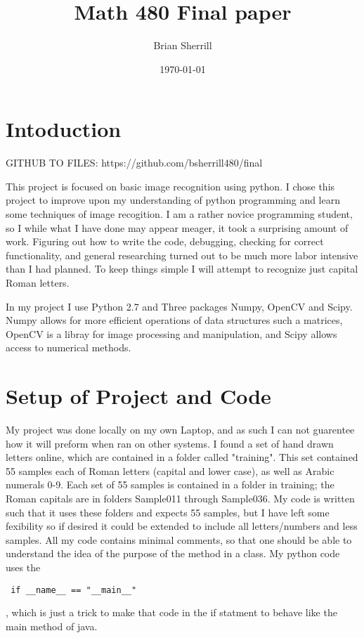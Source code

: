 \documentclass[a4paper]{article}
\title{Math 480 Final paper}
\author{Brian Sherrill}
\date{\today}
\begin{document}
\maketitle

\section*{Intoduction}
GITHUB TO FILES: https://github.com/bsherrill480/final

This project is focused on basic image recognition using python. I chose this project to improve upon my understanding of python programming and learn some techniques of image recogition. I am a rather novice programming student, so I while what I have done may appear meager, it took a surprising amount of work. Figuring out how to write the code, debugging, checking for correct functionality, and general researching turned out to be much more labor intensive than I had planned. To keep things simple I will attempt to recognize just capital Roman letters.

In my project I use Python 2.7 and Three packages Numpy, OpenCV and Scipy. Numpy allows for more efficient operations of data structures such a matrices, OpenCV is a libray for image processing and manipulation, and Scipy allows access to numerical methods. 
\newpage
\tableofcontents
\newpage

\section{Setup of Project and Code}

My project was done locally on my own Laptop, and as such I can not guarentee how it will preform when ran on other systems. I found a set of hand drawn letters online, which are contained in a folder called "training". This set contained 55 samples each of Roman letters (capital and lower case), as well as Arabic numerals 0-9. Each set of 55 samples is contained in a folder in training; the Roman capitals are in folders Sample011 through Sample036. My code is written such that it uses these folders and expects 55 samples, but I have left some fexibility so if desired it could be extended to include all letters/numbers and less samples. All my code contains minimal comments, so that one should be able to understand the idea of the purpose of the method in a class. My python code uses the \begin{verbatim} if __name__ == "__main__"\end{verbatim}, 
which is just a trick to make that code in the if statment to behave like the main method of java.
\end{document}
